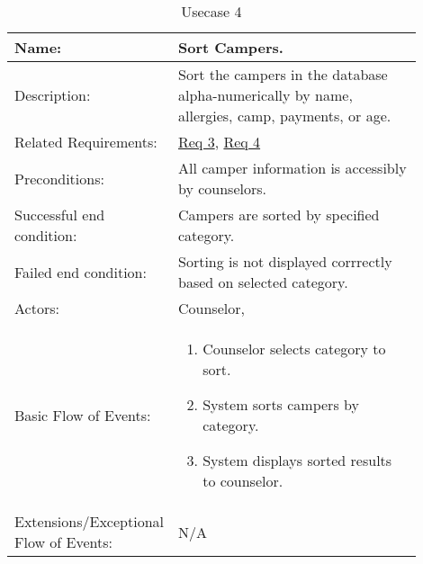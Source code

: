\documentclass[11pt]{article}
\begin{document}
\begin{table}[!htb]
\caption{Usecase 4}
\label{des:sort campers}
\begin{center}
\begin{tabular}{p{0.30\linewidth}p{0.60\linewidth}}
	Name: & Sort Campers.\\\hline
	Description: & Sort the campers in the database alpha-numerically by name, allergies, camp, payments, or age.\\\hline
	Related Requirements:& \hyperlink{Req3}{Req 3}, \hyperlink{Req4}{Req 4}\\\hline
	Preconditions:& All camper information is accessibly by counselors.\\\hline
	Successful end condition:& Campers are sorted by specified category.\\\hline
	Failed end condition:& Sorting is not displayed corrrectly based on selected category.\\\hline
	Actors:& Counselor,\\\hline
	Basic Flow of Events: & \begin{enumerate}[topsep=0pt]
		\item Counselor selects category to sort.
		\item System sorts campers by category.
		\item System displays sorted results to counselor.
	\end{enumerate}\\\hline
	Extensions/Exceptional Flow of Events: & \vspace*{.25em}  N/A
\end{tabular}
\end{center}
\end{table}

\end{document}
